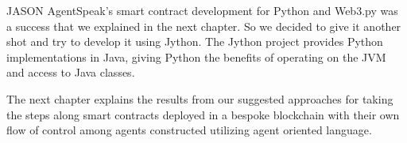 \vspace{.5cm}

JASON AgentSpeak's smart contract development for Python and Web3.py was a success that we explained in the next chapter. So we decided to give it another shot and try to develop it using Jython. The Jython project provides Python implementations in Java, giving Python the benefits of operating on the JVM and access to Java classes.

\vspace{.5cm}

The next chapter explains the results from our suggested approaches for taking the steps along smart contracts deployed in a bespoke blockchain with their own flow of control among agents constructed utilizing agent oriented language.

